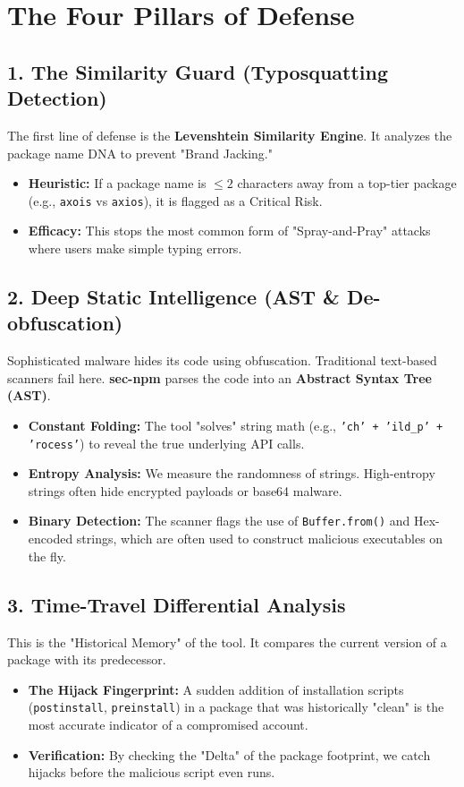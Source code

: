 \documentclass[12pt,a4paper]{article}
\begin{document}
\section{The Four Pillars of Defense}

\subsection{1. The Similarity Guard (Typosquatting Detection)}
The first line of defense is the \textbf{Levenshtein Similarity Engine}. It analyzes the package name DNA to prevent "Brand Jacking."
\begin{itemize}[label=\checkmark]
    \item \textbf{Heuristic:} If a package name is $\leq 2$ characters away from a top-tier package (e.g., \texttt{axois} vs \texttt{axios}), it is flagged as a Critical Risk.
    \item \textbf{Efficacy:} This stops the most common form of "Spray-and-Pray" attacks where users make simple typing errors.
\end{itemize}

\subsection{2. Deep Static Intelligence (AST \& De-obfuscation)}
Sophisticated malware hides its code using obfuscation. Traditional text-based scanners fail here. \textbf{sec-npm} parses the code into an \textbf{Abstract Syntax Tree (AST)}.
\begin{itemize}
    \item \textbf{Constant Folding:} The tool "solves" string math (e.g., \texttt{'ch' + 'ild\_p' + 'rocess'}) to reveal the true underlying API calls.
    \item \textbf{Entropy Analysis:} We measure the randomness of strings. High-entropy strings often hide encrypted payloads or base64 malware.
    \item \textbf{Binary Detection:} The scanner flags the use of \texttt{Buffer.from()} and Hex-encoded strings, which are often used to construct malicious executables on the fly.
\end{itemize}

\subsection{3. Time-Travel Differential Analysis}
This is the "Historical Memory" of the tool. It compares the current version of a package with its predecessor.
\begin{itemize}
    \item \textbf{The Hijack Fingerprint:} A sudden addition of installation scripts (\texttt{postinstall}, \texttt{preinstall}) in a package that was historically "clean" is the most accurate indicator of a compromised account.
    \item \textbf{Verification:} By checking the "Delta" of the package footprint, we catch hijacks before the malicious script even runs.
\end{itemize}
\end{document}
